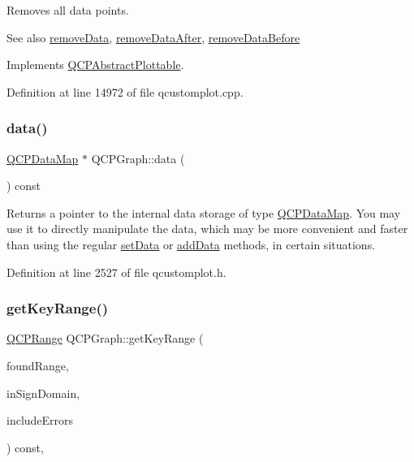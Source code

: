 Removes all data points. \begin{DoxySeeAlso}{See also}
\hyperlink{class_q_c_p_graph_a4a0fde50b7db9db0a85b5c5b6b10098f}{remove\+Data}, \hyperlink{class_q_c_p_graph_ae42d645ef617cfc75fc0df58e62c522a}{remove\+Data\+After}, \hyperlink{class_q_c_p_graph_a9fe0b3e54e8c7b61319bd03337e21e99}{remove\+Data\+Before} 
\end{DoxySeeAlso}


Implements \hyperlink{class_q_c_p_abstract_plottable_a86e5b8fd4b6ff4f4084e7ea4c573fc53}{Q\+C\+P\+Abstract\+Plottable}.



Definition at line 14972 of file qcustomplot.\+cpp.

\mbox{\label{class_q_c_p_graph_acde1c0d1f6a817930489548396e6b3e6}} 
\subsubsection{\texorpdfstring{data()}{data()}}
{\footnotesize\ttfamily \hyperlink{qcustomplot_8h_a84a9c4a4c2216ccfdcb5f3067cda76e3}{Q\+C\+P\+Data\+Map} $\ast$ Q\+C\+P\+Graph\+::data (\begin{DoxyParamCaption}{ }\end{DoxyParamCaption}) const\hspace{0.3cm}{\ttfamily [inline]}}

Returns a pointer to the internal data storage of type \hyperlink{qcustomplot_8h_a84a9c4a4c2216ccfdcb5f3067cda76e3}{Q\+C\+P\+Data\+Map}. You may use it to directly manipulate the data, which may be more convenient and faster than using the regular \hyperlink{class_q_c_p_graph_a1df2fd710545c8ba3b2c99a39a27bf8b}{set\+Data} or \hyperlink{class_q_c_p_graph_aa5c6181d84db72ce4dbe9dc15a34ef4f}{add\+Data} methods, in certain situations. 

Definition at line 2527 of file qcustomplot.\+h.

\mbox{\label{class_q_c_p_graph_ae6425d5df537c08159f794cb18c051c3}} 
\subsubsection{\texorpdfstring{get\+Key\+Range()}{getKeyRange()}}
{\footnotesize\ttfamily \hyperlink{class_q_c_p_range}{Q\+C\+P\+Range} Q\+C\+P\+Graph\+::get\+Key\+Range (\begin{DoxyParamCaption}\item[{bool \&}]{found\+Range,  }\item[{\hyperlink{class_q_c_p_abstract_plottable_a661743478a1d3c09d28ec2711d7653d8}{Sign\+Domain}}]{in\+Sign\+Domain,  }\item[{bool}]{include\+Errors }\end{DoxyParamCaption}) const\hspace{0.3cm}{\ttfamily [protected]}, {\ttfamily [virtual]}}


